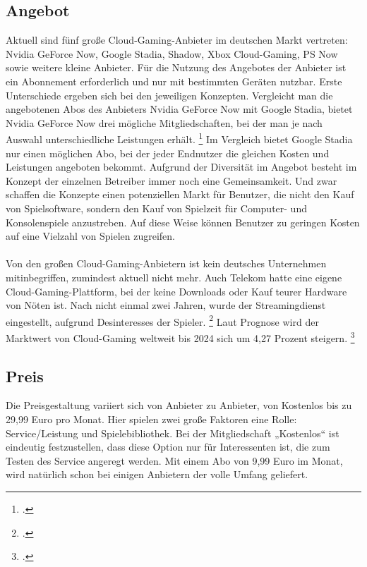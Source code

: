 \documentclass[12pt,toc=bib,toc=listof]{scrreprt}
\begin{document}
\subsection{Angebot}
\label{sec:Angebot}

Aktuell sind fünf große Cloud-Gaming-Anbieter im deutschen Markt vertreten: Nvidia GeForce Now, Google Stadia, Shadow, Xbox Cloud-Gaming, PS Now sowie weitere kleine Anbieter.  Für die Nutzung des Angebotes 
der Anbieter ist ein Abonnement erforderlich und nur mit bestimmten Geräten nutzbar. Erste Unterschiede ergeben sich bei den jeweiligen Konzepten. Vergleicht man die angebotenen Abos des Anbieters Nvidia GeForce 
Now mit Google Stadia, bietet Nvidia GeForce Now drei mögliche Mitgliedschaften, bei der man je nach Auswahl unterschiedliche Leistungen erhält. \footcite [Vgl.] [] {Suznjevic.2016}
Im Vergleich bietet Google Stadia nur einen möglichen Abo, bei der jeder Endnutzer die gleichen Kosten und Leistungen angeboten bekommt. Aufgrund der Diversität im Angebot besteht im Konzept der einzelnen Betreiber 
immer noch eine Gemeinsamkeit. Und zwar schaffen die Konzepte einen potenziellen Markt für Benutzer, die nicht den Kauf von Spielsoftware, sondern den Kauf von Spielzeit für Computer- und Konsolenspiele anzustreben.
Auf diese Weise können Benutzer zu geringen Kosten auf eine Vielzahl von Spielen zugreifen.
\\ \\
Von den großen Cloud-Gaming-Anbietern ist kein deutsches Unternehmen mitinbegriffen, zumindest aktuell nicht mehr. Auch Telekom hatte eine eigene Cloud-Gaming-Plattform, bei der keine Downloads oder Kauf teurer 
Hardware von Nöten ist. Nach nicht einmal zwei Jahren, wurde der Streamingdienst eingestellt, aufgrund Desinteresses der Spieler. \footcite [Vgl.] [] {Telekom.2022} Laut Prognose wird der Marktwert von Cloud-Gaming 
weltweit bis 2024 sich um 4,27 Prozent steigern. \footcite [Vgl.] [] {Clement.2022} 

\subsection{Preis}
\label{sec:Preis}

Die Preisgestaltung variiert sich von Anbieter zu Anbieter, von Kostenlos bis zu 29,99 Euro pro Monat. Hier spielen zwei große Faktoren eine Rolle: Service/Leistung und Spielebibliothek. Bei der Mitgliedschaft 
„Kostenlos“ ist eindeutig festzustellen, dass diese Option nur für Interessenten ist, die zum Testen des Service angeregt werden. Mit einem Abo von 9,99 Euro im Monat, wird natürlich schon bei einigen Anbietern der volle Umfang geliefert.
\end{document}
